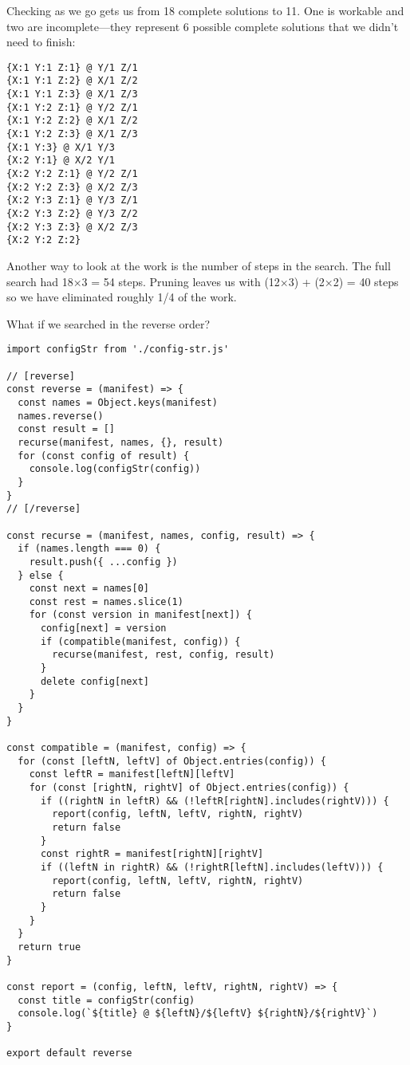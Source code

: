 \documentclass[krantzl]{krantz}
\begin{document}
Checking as we go gets us from 18 complete solutions to 11.
One is workable
and two are incomplete---they represent 6 possible complete solutions that we didn't need to finish:


\begin{lstlisting}[frame=single,frameround=tttt]
{X:1 Y:1 Z:1} @ Y/1 Z/1
{X:1 Y:1 Z:2} @ X/1 Z/2
{X:1 Y:1 Z:3} @ X/1 Z/3
{X:1 Y:2 Z:1} @ Y/2 Z/1
{X:1 Y:2 Z:2} @ X/1 Z/2
{X:1 Y:2 Z:3} @ X/1 Z/3
{X:1 Y:3} @ X/1 Y/3
{X:2 Y:1} @ X/2 Y/1
{X:2 Y:2 Z:1} @ Y/2 Z/1
{X:2 Y:2 Z:3} @ X/2 Z/3
{X:2 Y:3 Z:1} @ Y/3 Z/1
{X:2 Y:3 Z:2} @ Y/3 Z/2
{X:2 Y:3 Z:3} @ X/2 Z/3
{X:2 Y:2 Z:2}
\end{lstlisting}



Another way to look at the work is the number of steps in the search.
The full search had 18×3 = 54 steps.
Pruning leaves us with (12×3) + (2×2) = 40 steps
so we have eliminated roughly 1/4 of the work.


What if we searched in the reverse order?


\begin{lstlisting}[frame=single,frameround=tttt]
import configStr from './config-str.js'

// [reverse]
const reverse = (manifest) => {
  const names = Object.keys(manifest)
  names.reverse()
  const result = []
  recurse(manifest, names, {}, result)
  for (const config of result) {
    console.log(configStr(config))
  }
}
// [/reverse]

const recurse = (manifest, names, config, result) => {
  if (names.length === 0) {
    result.push({ ...config })
  } else {
    const next = names[0]
    const rest = names.slice(1)
    for (const version in manifest[next]) {
      config[next] = version
      if (compatible(manifest, config)) {
        recurse(manifest, rest, config, result)
      }
      delete config[next]
    }
  }
}

const compatible = (manifest, config) => {
  for (const [leftN, leftV] of Object.entries(config)) {
    const leftR = manifest[leftN][leftV]
    for (const [rightN, rightV] of Object.entries(config)) {
      if ((rightN in leftR) && (!leftR[rightN].includes(rightV))) {
        report(config, leftN, leftV, rightN, rightV)
        return false
      }
      const rightR = manifest[rightN][rightV]
      if ((leftN in rightR) && (!rightR[leftN].includes(leftV))) {
        report(config, leftN, leftV, rightN, rightV)
        return false
      }
    }
  }
  return true
}

const report = (config, leftN, leftV, rightN, rightV) => {
  const title = configStr(config)
  console.log(`${title} @ ${leftN}/${leftV} ${rightN}/${rightV}`)
}

export default reverse
\end{lstlisting}
\end{document}

